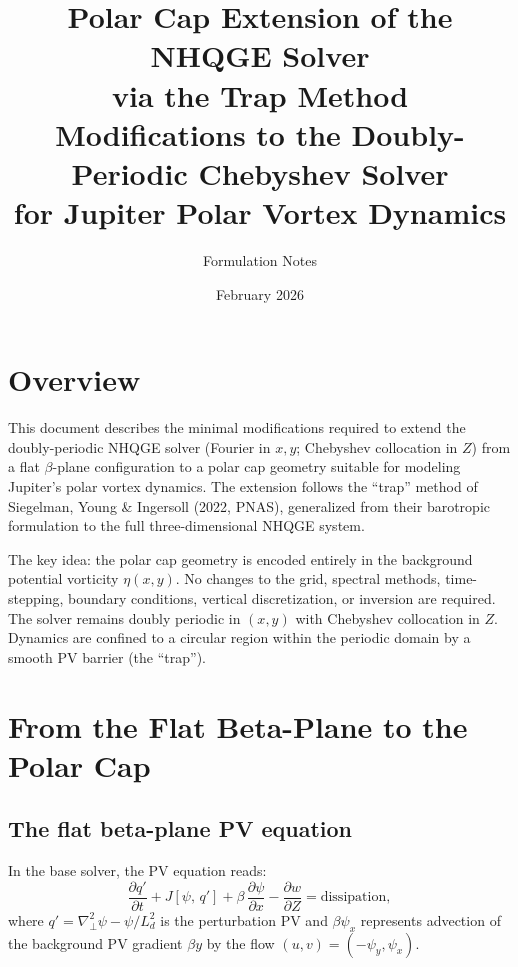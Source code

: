 \documentclass[11pt]{article}
\title{\textbf{Polar Cap Extension of the NHQGE Solver\\[4pt] via the Trap Method}\\[8pt]
\large Modifications to the Doubly-Periodic Chebyshev Solver\\for Jupiter Polar Vortex Dynamics}
\author{Formulation Notes}
\date{February 2026}
\newcommand{\pderiv}[2]{\frac{\partial #1}{\partial #2}}
\newcommand{\Ld}{L_d}
\newcommand{\Jac}[2]{J\!\left[#1,\,#2\right]}
\begin{document}
\maketitle
\vspace{1em}

\section{Overview}

This document describes the minimal modifications required to extend the doubly-periodic NHQGE solver (Fourier in $x,y$; Chebyshev collocation in $Z$) from a flat $\beta$-plane configuration to a polar cap geometry suitable for modeling Jupiter's polar vortex dynamics. The extension follows the ``trap'' method of Siegelman, Young \& Ingersoll (2022, PNAS), generalized from their barotropic formulation to the full three-dimensional NHQGE system.

The key idea: the polar cap geometry is encoded entirely in the background potential vorticity $\eta(x,y)$. No changes to the grid, spectral methods, time-stepping, boundary conditions, vertical discretization, or inversion are required. The solver remains doubly periodic in $(x,y)$ with Chebyshev collocation in $Z$. Dynamics are confined to a circular region within the periodic domain by a smooth PV barrier (the ``trap'').

\section{From the Flat Beta-Plane to the Polar Cap}

\subsection{The flat beta-plane PV equation}

In the base solver, the PV equation reads:
\begin{equation}
\pderiv{q'}{t} + \Jac{\psi}{q'} + \beta\,\pderiv{\psi}{x} - \pderiv{w}{Z} = \text{dissipation},
\label{eq:beta_plane}
\end{equation}
where $q' = \nabla_\perp^2\psi - \psi/\Ld^2$ is the perturbation PV and $\beta\psi_x$ represents advection of the background PV gradient $\beta y$ by the flow $(u,v) = (-\psi_y, \psi_x)$.
\end{document}
